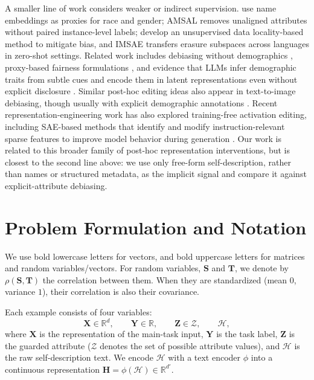 \documentclass[11pt]{article}
\newcommand{\rv}[1]{\mathbf{#1}}
\begin{document}
A smaller line of work considers weaker or indirect supervision. \citet{romanov-etal-2019-whats} use name embeddings as proxies for race and gender; AMSAL \cite{shao2023erasure} removes unaligned attributes without paired instance-level labels; \citet{han2023everybody} develop an unsupervised data locality-based method to mitigate bias, and IMSAE \citep{shao-etal-2025-iterative} transfers erasure subspaces across languages in zero-shot settings. Related work includes debiasing without demographics \citep{orgad-belinkov-2023-blind}, proxy-based fairness formulations \citep{gupta2018proxyfairness}, and evidence that LLMs infer demographic traits from subtle cues and encode them in latent representations even without explicit disclosure \citep{neplenbroek2025personalization}. Similar post-hoc editing ideas also appear in text-to-image debiasing, though usually with explicit demographic annotations \citep{fu2025fairimagen}. Recent representation-engineering work has also explored training-free activation editing, including SAE-based methods that identify and modify instruction-relevant sparse features to improve model behavior during generation \citep{zhao2025sparseactivationeditingreliable}.
Our work is related to this broader family of post-hoc representation interventions, but is closest to the second line above: we use only free-form self-description, rather than names or structured metadata, as the implicit signal and compare it against explicit-attribute debiasing.



\section{Problem Formulation and Notation}

We use bold lowercase letters for vectors, and bold uppercase letters for matrices and random variables/vectors. For random variables, $\rv{S}$ and $\rv{T}$, we denote by $\rho(\rv{S}, \rv{T})$ the correlation between them. When they are standardized (mean $0$, variance $1$), their correlation is also their covariance.

Each example consists of four variables:
\[
\rv{X} \in \mathbb{R}^{d}, \qquad
\rv{Y} \in \mathbb{R}, \qquad
\rv{Z} \in \mathcal{Z}, \qquad
\mathcal{H},
\]
where $\rv{X}$ is the representation of the main-task input, $\rv{Y}$ is the task label, $\rv{Z}$ is the guarded attribute ($\mathcal{Z}$ denotes the set of possible attribute values), and $\mathcal{H}$ is the raw self-description text. We encode $\mathcal{H}$ with a text encoder $\phi$ into a continuous representation
$\rv{H} = \phi(\mathcal{H}) \in \mathbb{R}^{d'}$.
\end{document}
